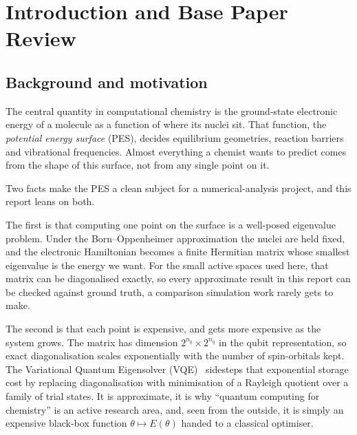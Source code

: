 \documentclass[sigconf,screen,nonacm]{acmart}
\makeatletter
\newcommand{\@resetcolroom}{%
  \ifdim\pagetotal=\z@
    \ifx\@toplist\@empty\ifx\@botlist\@empty\ifx\@midlist\@empty
      \global\@colroom\@colht
      \global\vsize\@colht
    \fi\fi\fi
  \fi}
\let\@origFloatBarrier\FloatBarrier
\renewcommand{\FloatBarrier}{\@origFloatBarrier\@resetcolroom}
\makeatother
\begin{document}


\maketitle

\FloatBarrier
\section{Introduction and Base Paper Review}
\label{sec:intro}

\subsection{Background and motivation}
The central quantity in computational chemistry is the ground-state
electronic energy of a molecule as a function of where its nuclei sit. That
function, the \emph{potential energy surface} (PES), decides equilibrium
geometries, reaction barriers and vibrational frequencies. Almost everything
a chemist wants to predict comes from the shape of this surface, not from any
single point on it.

Two facts make the PES a clean subject for a numerical-analysis project, and
this report leans on both.

The first is that computing one point on the surface is a well-posed
eigenvalue problem. Under the Born--Oppenheimer approximation the nuclei are
held fixed, and the electronic Hamiltonian becomes a finite Hermitian matrix
whose smallest eigenvalue is the energy we want. For the small active spaces
used here, that matrix can be diagonalised exactly, so every approximate
result in this report can be checked against ground truth, a comparison
simulation work rarely gets to make.

The second is that each point is expensive, and gets more expensive as the
system grows. The matrix has dimension $2^{n_q}\times2^{n_q}$ in the qubit
representation, so exact diagonalisation scales exponentially with the number
of spin-orbitals kept. The Variational Quantum Eigensolver
(VQE)~\cite{peruzzo2014,mcclean2016} sidesteps that exponential storage cost
by replacing diagonalisation with minimisation of a Rayleigh quotient over a
family of trial states. It is approximate, it is why ``quantum computing for
chemistry'' is an active research area, and, seen from the outside, it is
simply an expensive black-box function $\theta \mapsto E(\theta)$ handed to a
classical optimiser.
\end{document}
